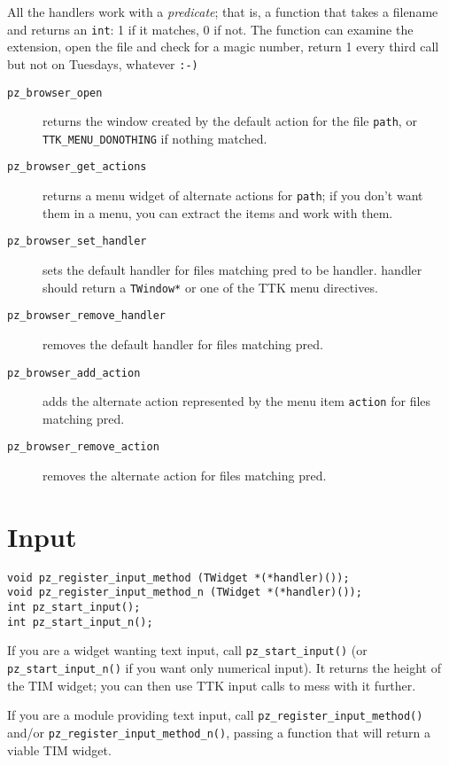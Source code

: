 \documentclass[12pt,letterpaper]{report}
\let\ttt\tt
\def\tt{\def\_{{\ttt\char`\_}}\ttt}
\def\texttt#1{{\tt #1}}
\begin{document}
All the handlers work with a {\sl predicate}; that is, a function that takes
a filename and returns an \verb|int|: 1 if it matches, 0 if not. The function
can examine the extension, open the file and check for a magic number, return
1 every third call but not on Tuesdays, whatever \texttt{:-)}

\begin{description}
\item[{\tt pz_browser_open}] returns the window created by the default action for the file
\verb|path|, or \verb|TTK_MENU_DONOTHING| if nothing matched.
\item[{\tt pz_browser_get_actions}] returns a menu widget of alternate actions for \verb|path|;
if you don't want them in a menu, you can extract the items and work with them.
\item[{\tt pz_browser_set_handler}] sets the default handler for files matching {\sf pred} to
be {\sf handler}. {\sf handler} should return a \verb|TWindow*| or one of the TTK menu directives.
\item[{\tt pz_browser_remove_handler}] removes the default handler for files matching {\sf pred}.
\item[{\tt pz_browser_add_action}] adds the alternate action represented by the menu item
\verb|action| for files matching {\sf pred}.
\item[{\tt pz_browser_remove_action}] removes the alternate action for files matching {\sf pred}.
\end{description}

\section{Input}
\begin{verbatim}
void pz_register_input_method (TWidget *(*handler)());
void pz_register_input_method_n (TWidget *(*handler)());
int pz_start_input();
int pz_start_input_n();
\end{verbatim}

If you are a widget wanting text input, call \verb|pz_start_input()| (or \verb|pz_|\hskip0pt\verb|start_|\hskip0pt\verb|input_n()|
if you want only numerical input). It returns the height of the TIM widget; you can then use
TTK input calls to mess with it further.

If you are a module providing text input, call \verb|pz_register_input_method()| and/or
\verb|pz_register_input_method_n()|, passing a function that will return a viable TIM widget.
\end{document}
